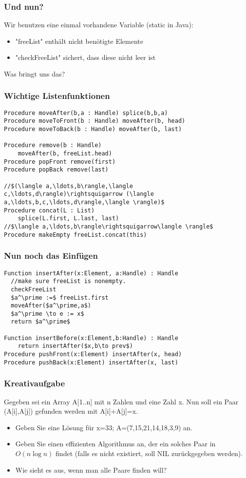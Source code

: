 \begin{frame}
\frametitle{Und nun?}
Wir benutzen eine einmal vorhandene Variable (static in Java):
\begin{itemize}
\item "freeList" enthält nicht benötigte Elemente
\item "checkFreeList" sichert, dass diese nicht leer ist
\end{itemize}\pause
Was bringt uns das?
\end{frame}

\begin{frame}[fragile]
\frametitle{Wichtige Listenfunktionen}
\begin{lstlisting}
Procedure moveAfter(b,a : Handle) splice(b,b,a)
Procedure moveToFront(b : Handle) moveAfter(b, head)
Procedure moveToBack(b : Handle) moveAfter(b, last)

Procedure remove(b : Handle)
    moveAfter(b, freeList.head)
Procedure popFront remove(first)
Procedure popBack remove(last)

//$(\langle a,\ldots,b\rangle,\langle c,\ldots,d\rangle)\rightsquigarrow (\langle a,\ldots,b,c,\ldots,d\rangle,\langle \rangle)$
Procedure concat(L : List)
    splice(L.first, L.last, last)
//$\langle a,\ldots,b\rangle\rightsquigarrow\langle \rangle$
Procedure makeEmpty freeList.concat(this)
\end{lstlisting}
\end{frame}

\begin{frame}[fragile]
\frametitle{Nun noch das Einfügen}
\begin{lstlisting}
Function insertAfter(x:Element, a:Handle) : Handle
  //make sure freeList is nonempty.
  checkFreeList
  $a^\prime :=$ freeList.first
  moveAfter($a^\prime,a$)
  $a^\prime \to e := x$
  return $a^\prime$
  
Function insertBefore(x:Element,b:Handle) : Handle
    return insertAfter($x,b\to prev$)
Procedure pushFront(x:Element) insertAfter(x, head)
Procedure pushBack(x:Element) insertAfter(x, last)
\end{lstlisting}
\end{frame}

\begin{frame}
\frametitle{Kreativaufgabe}
Gegeben sei ein Array A[1..n] mit n Zahlen und eine Zahl x. Nun soll ein Paar (A[i],A[j]) gefunden werden mit A[i]+A[j]=x.
\begin{itemize}
\item Geben Sie eine Lösung für x=33; A=(7,15,21,14,18,3,9) an. \\ \pause
\item Geben Sie einen effizienten Algorithmus an, der ein solches Paar in $O(n\log n)$ findet (falls es nicht existiert, soll NIL zurückgegeben werden).\pause
\item Wie sieht es aus, wenn man alle Paare finden will?
\end{itemize}
\end{frame}
